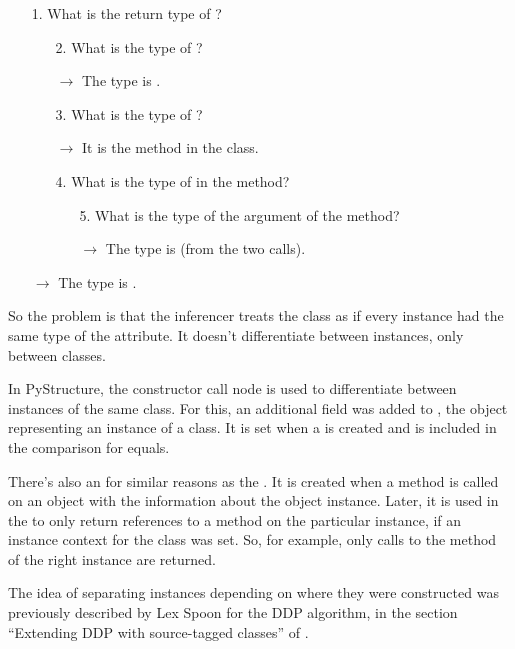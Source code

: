 \documentclass[12pt,halfparskip,DIV11,BCOR10mm]{scrreprt}
\begin{document}
\begin{enumerate}
    \item[1.] What is the return type of ?
    \begin{enumerate}
        \item[2.] What is the type of ?
        \item[] $\rightarrow$ The type is .
        \item[3.] What is the type of ?
        \item[] $\rightarrow$ It is the  method in the  class.
        \item[4.] What is the type of  in the  method?
        \begin{enumerate}
            \item [5.] What is the type of the  argument of the  method?
            \item [] $\rightarrow$ The type is  (from the two  calls).
        \end{enumerate}
    \end{enumerate}
    \item [] $\rightarrow$ The type is .
\end{enumerate}

So the problem is that the inferencer treats the  class as if every instance had the same type of the  attribute. It doesn't differentiate between instances, only between classes.


In PyStructure, the constructor call node is used to differentiate between instances of the same class. For this, an additional field  was added to , the object representing an instance of a class. It is set when a  is created and is included in the comparison for equals.

There's also an  for similar reasons as the . It is created when a method is called on an object with the information about the object instance. Later, it is used in the  to only return references to a method on the particular instance, if an instance context for the class was set. So, for example, only calls to the  method of the right instance are returned.

The idea of separating instances depending on where they were constructed was previously described by Lex Spoon for the DDP algorithm, in the section ``Extending DDP with source-tagged classes'' of \cite{ddp}.
\end{document}
